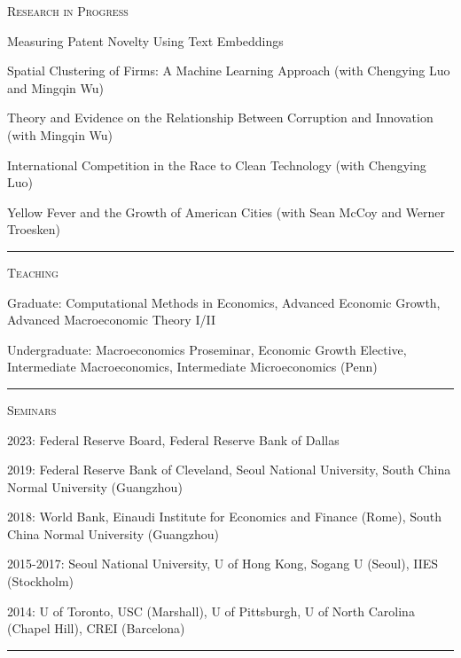 \documentclass{article}
\begin{document}
\parbox{\textwidth}{
\parbox[t]{0.28\textwidth}{ \raggedright \noindent \textsc{ Research in Progress } }
\parbox[t]{0.72\textwidth}{ \raggedright

Measuring Patent Novelty Using Text Embeddings
\vspace{0.27cm}

Spatial Clustering of Firms: A Machine Learning Approach (with Chengying Luo and Mingqin Wu)
\vspace{0.27cm}

Theory and Evidence on the Relationship Between Corruption and Innovation (with Mingqin Wu)
\vspace{0.27cm}

International Competition in the Race to Clean Technology (with Chengying Luo)
\vspace{0.27cm}

Yellow Fever and the Growth of American Cities (with Sean McCoy and Werner Troesken)
\vspace{0.27cm}

}
\textcolor{light-gray}{\hrule}
}
\vspace{0.3cm}

\parbox{\textwidth}{
\parbox[t]{0.28\textwidth}{ \raggedright \noindent \textsc{ Teaching } }
\parbox[t]{0.72\textwidth}{ \raggedright

Graduate: Computational Methods in Economics, Advanced Economic Growth, Advanced Macroeconomic Theory I/II
\vspace{0.27cm}

Undergraduate: Macroeconomics Proseminar, Economic Growth Elective, Intermediate Macroeconomics, Intermediate Microeconomics (Penn)
\vspace{0.27cm}

}
\textcolor{light-gray}{\hrule}
}
\vspace{0.3cm}

\parbox{\textwidth}{
\parbox[t]{0.28\textwidth}{ \raggedright \noindent \textsc{ Seminars } }
\parbox[t]{0.72\textwidth}{ \raggedright

2023: Federal Reserve Board, Federal Reserve Bank of Dallas
\vspace{0.27cm}

2019: Federal Reserve Bank of Cleveland, Seoul National University, South China Normal University (Guangzhou)
\vspace{0.27cm}

2018: World Bank, Einaudi Institute for Economics and Finance (Rome), South China Normal University (Guangzhou)
\vspace{0.27cm}

2015-2017: Seoul National University, U of Hong Kong, Sogang U (Seoul), IIES (Stockholm)
\vspace{0.27cm}

2014: U of Toronto, USC (Marshall), U of Pittsburgh, U of North Carolina (Chapel Hill), CREI (Barcelona)
\vspace{0.27cm}

}
\textcolor{light-gray}{\hrule}
}
\vspace{0.3cm}
\end{document}
